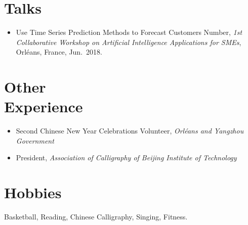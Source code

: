 \documentclass{mycv}
\begin{document}

\section{Talks}

\begin{itemize}
  \item Use Time Series Prediction Methods to Forecast Customers Number, \emph{1st Collaborative Workshop on Artificial Intelligence Applications for SMEs}, Orl\'eans, France, Jun.~2018.
\end{itemize}

\section{Other \\ Experience}

\begin{itemize}
    \item Second Chinese New Year Celebrations Volunteer, \emph{Orl\'eans and Yangzhou Government} 
    \item President, \emph{Association of Calligraphy of Beijing Institute of Technology} 
\end{itemize}

\section{Hobbies}

Basketball, Reading, Chinese Calligraphy, Singing, Fitness.
\end{document}
